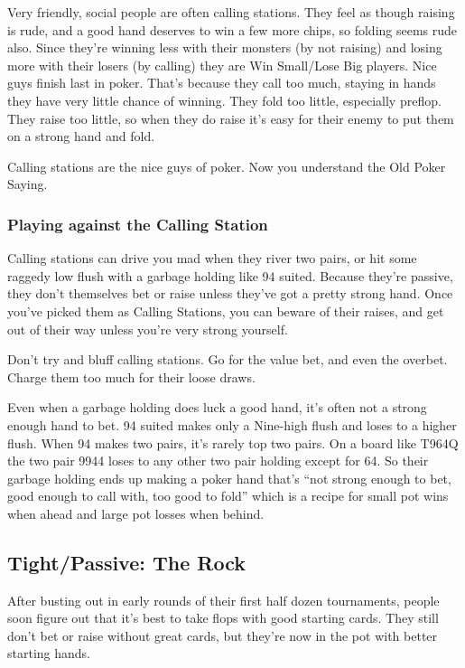 Very friendly, social people are often calling stations.
They feel as though raising is rude, and a good hand deserves
to win a few more chips, so folding seems rude also. Since
they're winning less with their monsters (by not raising)
and losing more with their losers (by calling) they are
Win Small/Lose Big players. Nice guys
finish last in poker. That's because they call too much, staying
in hands they have very little chance of winning. They fold
too little, especially preflop. They raise too little, so when
they do raise it's easy for their enemy to put them on a strong hand
and fold.

Calling stations are the nice guys of poker. Now you understand the
Old Poker Saying.

\subsubsection{Playing against the Calling Station}

Calling stations can drive you mad when they river two pairs,
or hit some raggedy low flush with a garbage holding like 94 suited.
Because they're passive, they don't themselves bet or raise unless
they've got a pretty strong hand. Once you've picked them as
Calling Stations, you can beware of their raises, and get out of
their way unless you're very strong yourself.

Don't try and bluff calling stations. Go for the value bet,
and even the overbet. Charge them too much for their loose draws.

Even when a garbage holding does luck a good hand, it's often
not a strong enough hand to bet. 94 suited makes only a Nine-high
flush and loses to a higher flush. When 94 makes two pairs,
it's rarely top two pairs. On a board like T964Q the two pair 9944
loses to any other two pair holding except for 64. So their garbage
holding ends up making a poker hand that's ``not strong enough to bet,
good enough to call with, too good to fold'' which is a recipe for
small pot wins when ahead and large pot losses when behind.

\subsection{Tight/Passive: The Rock}

After busting out in early rounds of their first half dozen
tournaments, people soon figure out that it's best to take flops
with good starting cards. They still don't bet or raise without
great cards, but they're now in the pot with better starting hands.

